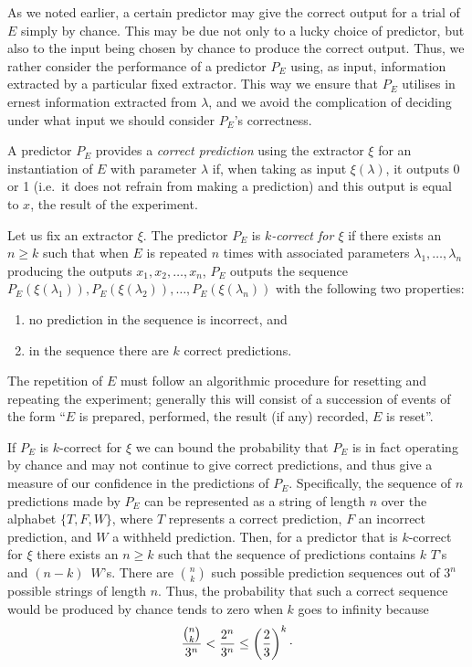 \documentclass[%
 superscriptaddress,
 preprint,
 showpacs,
 showkeys,
 preprintnumbers,
 nofootinbib,
  amsmath,amssymb,
  aps,
 pra,
  longbibliography,
  floatfix,
 ]{revtex4-1}
\theoremstyle{definition}
\newcommand{\rb}{\raisebox{0.5ex}}
\begin{document}
As we noted earlier, a certain predictor may give the correct output for a trial of $E$ simply by chance.
This may be due not only to a lucky choice of predictor, but also to the input being chosen by chance to produce the correct output.
Thus, we rather  consider the performance of a predictor $P_E$  using, as input, information extracted by a particular fixed extractor.
This way we ensure that $P_E$ utilises in ernest information extracted from $\lambda$,
and we avoid the complication of deciding under what input we should consider $P_E$'s correctness.

A predictor $P_E$ provides a \emph{correct prediction} using the extractor $\xi$ for an instantiation of $E$ with parameter $\lambda$ if, when taking as input $\xi(\lambda)$, it outputs 0 or 1 (i.e.\ it does not refrain from making a prediction) and this output is equal to $x$, the result of the experiment.

Let us fix an extractor $\xi$. The predictor $P_E$ is \emph{$k$-correct for $\xi$} if there exists an $n\ge k$ such that when $E$ is repeated $n$ times with associated parameters $\lambda_1 ,\dots, \lambda_n$ producing the outputs $x_1,x_2,\dots ,x_n$, $P_E$ outputs the sequence $P_E(\xi(\lambda_1)), P_E(\xi(\lambda_2)),\dots ,P_E(\xi(\lambda_n))$ with the following two properties:
\begin{enumerate}
\item no prediction in the sequence is incorrect, and
\item in the sequence there are $k$ correct predictions.
\end{enumerate}
The repetition of $E$ must follow an algorithmic procedure for resetting and repeating the experiment;
generally this will consist of a succession of events of the form ``$E$ is prepared, performed, the result (if any)  recorded, $E$ is reset''.


If $P_E$ is $k$-correct for $\xi$ we can bound the probability that $P_E$ is in fact operating by chance and may not continue to give correct predictions, and thus give a measure of our confidence in the predictions of $P_E$.
Specifically, the sequence of $n$ predictions made by $P_E$ can be represented as a string of length $n$ over the alphabet $\{T,F,W\}$, where $T$ represents a correct prediction, $F$ an incorrect prediction, and $W$ a withheld prediction.
Then, for a predictor that is $k$-correct for $\xi$ there exists an $n\ge k$ such that the sequence of predictions contains $k$ $T$'s and $(n-k)\,$ $W$'s.
There are ${n \choose k}$ such possible prediction sequences out of $3^n$ possible strings of length $n$.
Thus, the probability that such a correct sequence would be produced by chance tends to zero when $k$ goes to infinity because
$$\frac{{n\choose k}}{3^n}<\frac{2^n}{3^n}\le \left(\frac{2}{3}\right)^k\rb.$$
\end{document}
